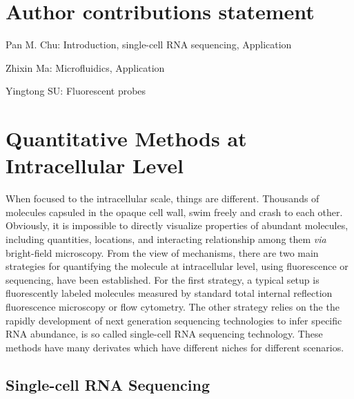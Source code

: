 \documentclass[fleqn,10pt]{wlscirep}
\begin{document}





\section*{Author contributions statement}

Pan M. Chu: Introduction, single-cell RNA sequencing, Application

Zhixin Ma: Microfluidics, Application

Yingtong SU: Fluorescent probes

\section[]{Quantitative Methods at Intracellular Level}

When focused to the intracellular scale, things are different. Thousands of molecules capsuled in the opaque cell wall, swim freely and crash to each other. Obviously, it is impossible to directly visualize properties of abundant molecules, including quantities, locations, and interacting relationship among them \emph{via} bright-field microscopy. From the view of mechanisms, there are two main strategies for quantifying the molecule at intracellular level, using fluorescence or sequencing, have been established. For the first strategy, a typical setup is fluorescently labeled molecules measured by standard total internal reflection fluorescence microscopy or flow cytometry. The other strategy relies on the the rapidly development of next generation sequencing technologies to infer specific RNA abundance, is so called single-cell RNA sequencing technology. These methods have many derivates which have different niches for different scenarios.

\subsection[]{Single-cell RNA Sequencing}
\end{document}

